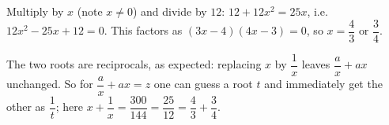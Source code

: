 Multiply by $x$ (note $x\ne0$) and divide by $12$: $12+12x^2=25x$, i.e. $12x^2-25x+12=0$. This factors as $(3x-4)(4x-3)=0$, so $x=\boxed{\dfrac{4}{3}\text{ or }\dfrac{3}{4}}$.

The two roots are reciprocals, as expected: replacing $x$ by $\dfrac{1}{x}$ leaves $\dfrac {a}{x}+ax$ unchanged. So for $\dfrac {a}{x}+ax=z$ one can guess a root $t$ and immediately get the other as $\dfrac{1}{t}$; here $x+\dfrac{1}{x}=\dfrac{300}{144}=\dfrac{25}{12}=\dfrac{4}{3}+\dfrac{3}{4}$.
